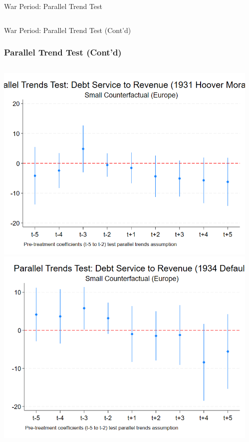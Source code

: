 \documentclass{beamer}
\begin{document}
\begin{frame}{War Period: Parallel Trend Test}
\begin{columns}
\begin{column}{0.5\textwidth}
    \end{column}
  \end{columns}
\end{frame}

\begin{frame}{War Period: Parallel Trend Test (Cont'd)}
  \frametitle{Parallel Trend Test (Cont'd)}
  \begin{columns}[T] %
    \begin{column}{0.45\textwidth}
      \centering
      \includegraphics[width=0.9\linewidth]{figures/PT_DebtServ_1931_Small.png}
      \includegraphics[width=0.9\linewidth]{figures/PT_DebtServ_1934_Small.png}
    \end{column}
    \begin{column}{0.45\textwidth}

\end{column}
\end{columns}
\end{frame}
\end{document}
